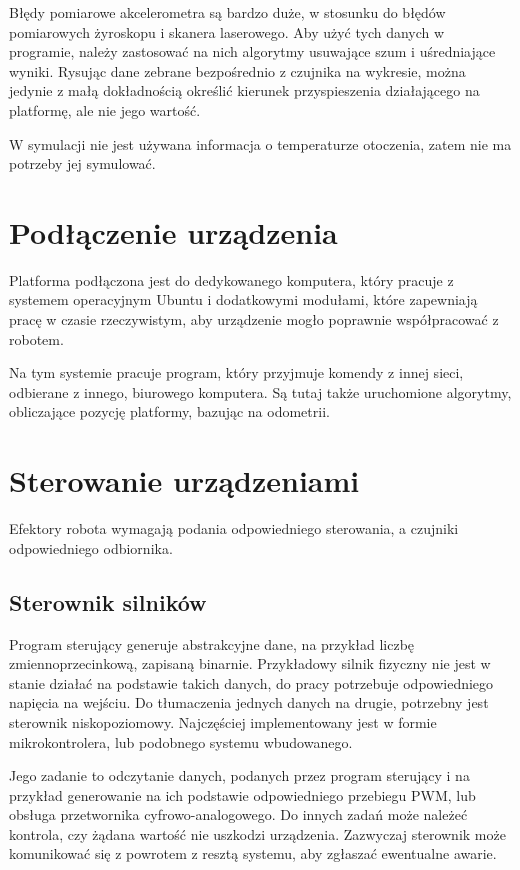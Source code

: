 	Błędy pomiarowe akcelerometra są bardzo duże, w stosunku do błędów pomiarowych żyroskopu i skanera laserowego. 
	Aby użyć tych danych w programie, należy zastosować na nich algorytmy usuwające szum i uśredniające wyniki.
	Rysując dane zebrane bezpośrednio z czujnika na wykresie, można jedynie z małą dokładnością określić kierunek przyspieszenia działającego na platformę, ale nie jego 
	wartość.
	
	W symulacji nie jest używana informacja o temperaturze otoczenia, zatem nie ma potrzeby jej symulować.
	
\section{Podłączenie urządzenia}
	Platforma podłączona jest do dedykowanego komputera, który pracuje z systemem operacyjnym Ubuntu i dodatkowymi modułami, które zapewniają 
	pracę w czasie rzeczywistym, aby urządzenie mogło poprawnie współpracować z robotem.
	
	Na tym systemie pracuje program, który przyjmuje komendy z innej sieci, odbierane z innego, biurowego komputera.
	Są tutaj także uruchomione algorytmy, obliczające pozycję platformy, bazując na odometrii.
	
\section{Sterowanie urządzeniami}
	Efektory robota wymagają podania odpowiedniego sterowania, a czujniki odpowiedniego odbiornika.
	\subsection{Sterownik silników}
		Program sterujący generuje abstrakcyjne dane, na przykład liczbę zmiennoprzecinkową, zapisaną binarnie.
		Przykładowy silnik fizyczny nie jest w stanie działać na podstawie takich danych, do pracy potrzebuje odpowiedniego napięcia na wejściu.
		Do tłumaczenia jednych danych na drugie, potrzebny jest sterownik niskopoziomowy.
		Najczęściej implementowany jest w formie mikrokontrolera, lub podobnego systemu wbudowanego.

		Jego zadanie to odczytanie danych, podanych przez program sterujący i na przykład generowanie na ich podstawie odpowiedniego przebiegu PWM, lub obsługa przetwornika cyfrowo-analogowego.
		Do innych zadań może należeć kontrola, czy żądana wartość nie uszkodzi urządzenia.
		Zazwyczaj sterownik może komunikować się z powrotem z resztą systemu, aby zgłaszać ewentualne awarie.

